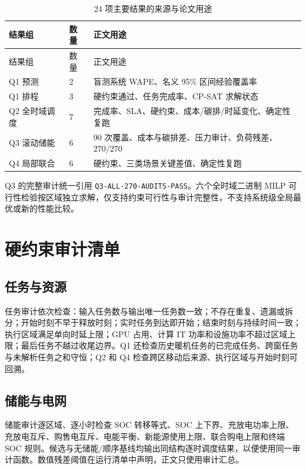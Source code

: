 \begin{longtable}{p{}p{}p{}}
\caption{24 项主要结果的来源与论文用途}\label{tab:claim-index}\\
\toprule
结果组 & 数量 & 正文用途 \\
\midrule
\endfirsthead
\toprule
结果组 & 数量 & 正文用途 \\
\midrule
\endhead
Q1 预测 & 2 & 盲测系统 WAPE、名义 95\% 区间经验覆盖率 \\
Q1 排程 & 3 & 硬约束通过、任务完成率、CP-SAT 求解状态 \\
Q2 全时域调度 & 7 & 完成率、SLA、硬约束、成本/碳排/时延变化、确定性复跑 \\
Q3 滚动储能 & 6 & 90 次覆盖、成本与碳排差、压力审计、负荷残差、270/270 \\
Q4 局部联合 & 6 & 硬约束、三类场景关键差值、确定性复跑 \\
\bottomrule
\end{longtable}

Q3 的完整审计统一引用 \texttt{Q3-ALL-270-AUDITS-PASS}。六个全时域二进制 MILP 可行性检验按区域独立求解，仅支持约束可行性与审计完整性，不支持系统级全局最优或新的性能比较。

\section{硬约束审计清单}

\subsection{任务与资源}

任务审计依次检查：输入任务数与输出唯一任务数一致；不存在重复、遗漏或拆分；开始时刻不早于释放时刻；实时任务到达即开始；结束时刻与持续时间一致；执行区域满足单向时延上限；GPU 占用、计算 IT 功率和设施功率不超过区域上限；最后任务不越过收尾边界。Q1 还检查历史暖机任务的已完成任务、跨窗任务与未解析任务之和守恒；Q2 和 Q4 检查跨区移动后来源、执行区域与开始时刻可回溯。

\subsection{储能与电网}

储能审计逐区域、逐小时检查 SOC 转移等式、SOC 上下界、充放电功率上限、充放电互斥、购售电互斥、电能平衡、新能源使用上限、联合购电上限和终端 SOC 规则。候选与无储能/顺序基线均输出同结构逐时调度结果，以便使用同一审计函数。数值残差阈值在运行清单中声明，正文只使用审计汇总。

